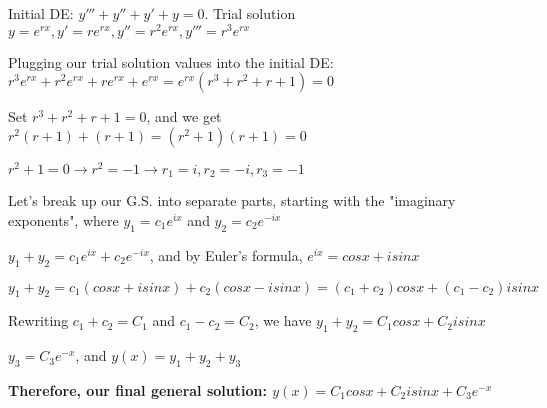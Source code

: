 \documentclass{article}
\begin{document}
Initial DE: $y''' + y'' + y' + y = 0$.  Trial solution $y = e^{rx}, y' = re^{rx}, y'' = r^{2}e^{rx}, y''' = r^{3}e^{rx}$ \par\vspace{0.25cm}

\noindent Plugging our trial solution values into the initial DE: $r^{3}e^{rx} + r^{2}e^{rx} + re^{rx} + e^{rx} = e^{rx}(r^{3} + r^{2} + r + 1) = 0$ \par
\noindent Set $r^{3} + r^{2} + r + 1 = 0$, and we get $r^{2}(r + 1) + (r + 1) = (r^{2} + 1)(r + 1) = 0$ \par
\noindent $r^{2} + 1 = 0 \rightarrow r^{2} = -1 \rightarrow r_{1} = i, r_{2} = -i, r_{3} = -1$ \par\vspace{0.25cm}

\noindent Let's break up our G.S. into separate parts, starting with the "imaginary exponents", where $y_{1} = c_{1}e^{ix}$ and $y_{2} = c_{2}e^{-ix}$ \par
\noindent $y_{1} + y_{2} = c_{1}e^{ix} + c_{2}e^{-ix}$, and by Euler's formula, $e^{ix} = cosx + isinx$ \par
\noindent $y_{1} + y_{2} = c_{1}(cosx + isinx) + c_{2}(cosx - isinx) = (c_{1} + c_{2})cosx + (c_{1} - c_{2})isinx$ \par
\noindent Rewriting $c_{1} + c_{2} = C_{1}$ and $c_{1} - c_{2} = C_{2}$, we have $y_{1} + y_{2} = C_{1}cosx + C_{2}isinx$ \par\vspace{0.25cm}

\noindent $y_{3} = C_{3}e^{-x}$, and $y(x) = y_{1} + y_{2} + y_{3}$ \par\vspace{0.25cm}

\noindent \textbf{Therefore, our final general solution: $y(x) = C_{1}cosx + C_{2}isinx + C_{3}e^{-x}$}
\end{document}
